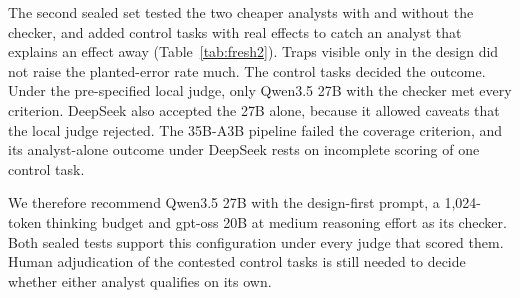 The second sealed set tested the two cheaper analysts with and without the checker, and added control tasks with real effects to catch an analyst that explains an effect away (Table~\ref{tab:fresh2}). Traps visible only in the design did not raise the planted-error rate much. The control tasks decided the outcome. Under the pre-specified local judge, only Qwen3.5 27B with the checker met every criterion. DeepSeek also accepted the 27B alone, because it allowed caveats that the local judge rejected. The 35B-A3B pipeline failed the coverage criterion, and its analyst-alone outcome under DeepSeek rests on incomplete scoring of one control task.

We therefore recommend Qwen3.5 27B with the design-first prompt, a 1,024-token thinking budget and gpt-oss 20B at medium reasoning effort as its checker. Both sealed tests support this configuration under every judge that scored them. Human adjudication of the contested control tasks is still needed to decide whether either analyst qualifies on its own.


